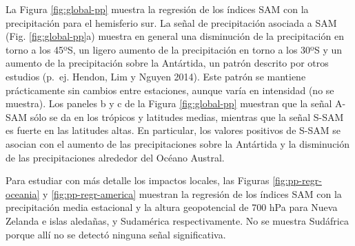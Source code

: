 \documentclass[12pt,oneside,a4paper]{reedthesis}
\begin{document}
La Figura \ref{fig:global-pp} muestra la regresión de los índices SAM con la precipitación para el hemisferio sur.
La señal de precipitación asociada a SAM (Fig. \ref{fig:global-pp}a) muestra en general una disminución de la precipitación en torno a los 45ºS, un ligero aumento de la precipitación en torno a los 30ºS y un aumento de la precipitación sobre la Antártida, un patrón descrito por otros estudios (p.~ej. Hendon, Lim y Nguyen 2014).
Este patrón se mantiene prácticamente sin cambios entre estaciones, aunque varía en intensidad (no se muestra).
Los paneles b y c de la Figura \ref{fig:global-pp} muestran que la señal A-SAM sólo se da en los trópicos y latitudes medias, mientras que la señal S-SAM es fuerte en las latitudes altas.
En particular, los valores positivos de S-SAM se asocian con el aumento de las precipitaciones sobre la Antártida y la disminución de las precipitaciones alrededor del Océano Austral.

Para estudiar con más detalle los impactos locales, las Figuras \ref{fig:pp-regr-oceania} y \ref{fig:pp-regr-america} muestran la regresión de los índices SAM con la precipitación media estacional y la altura geopotencial de 700 hPa para Nueva Zelanda e islas aledañas, y Sudamérica respectivamente.
No se muestra Sudáfrica porque allí no se detectó ninguna señal significativa.
\end{document}
